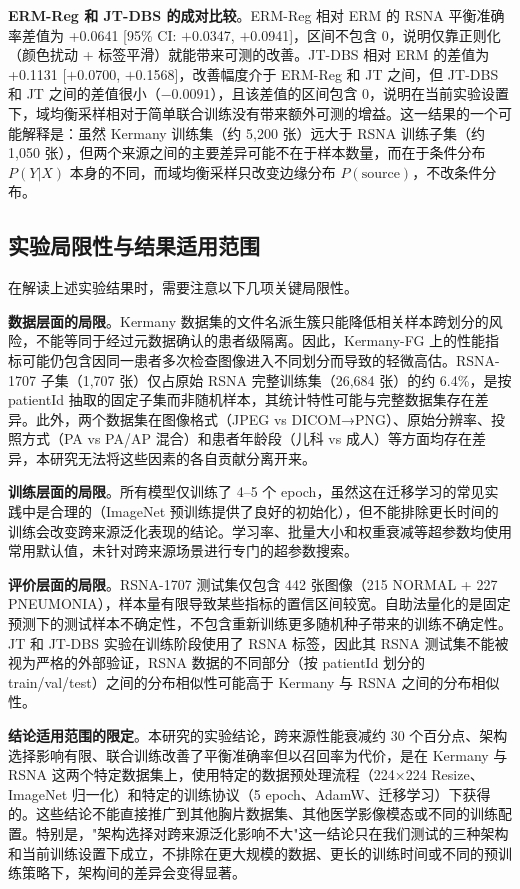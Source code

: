 \documentclass[12pt,a4paper,UTF8,openany]{ctexbook}
\begin{document}
\textbf{ERM-Reg 和 JT-DBS 的成对比较}。ERM-Reg 相对 ERM 的 RSNA 平衡准确率差值为 +0.0641 [95\% CI: $+$0.0347, $+$0.0941]，区间不包含 0，说明仅靠正则化（颜色扰动 + 标签平滑）就能带来可测的改善。JT-DBS 相对 ERM 的差值为 +0.1131 [$+$0.0700, $+$0.1568]，改善幅度介于 ERM-Reg 和 JT 之间，但 JT-DBS 和 JT 之间的差值很小（$-0.0091$），且该差值的区间包含 0，说明在当前实验设置下，域均衡采样相对于简单联合训练没有带来额外可测的增益。这一结果的一个可能解释是：虽然 Kermany 训练集（约 5,200 张）远大于 RSNA 训练子集（约 1,050 张），但两个来源之间的主要差异可能不在于样本数量，而在于条件分布 $P(Y|X)$ 本身的不同，而域均衡采样只改变边缘分布 $P(\text{source})$，不改条件分布。

\subsection{实验局限性与结果适用范围}

在解读上述实验结果时，需要注意以下几项关键局限性。

\textbf{数据层面的局限}。Kermany 数据集的文件名派生簇只能降低相关样本跨划分的风险，不能等同于经过元数据确认的患者级隔离。因此，Kermany-FG 上的性能指标可能仍包含因同一患者多次检查图像进入不同划分而导致的轻微高估。RSNA-1707 子集（1,707 张）仅占原始 RSNA 完整训练集（26,684 张）的约 6.4\%，是按 patientId 抽取的固定子集而非随机样本，其统计特性可能与完整数据集存在差异。此外，两个数据集在图像格式（JPEG vs DICOM→PNG）、原始分辨率、投照方式（PA vs PA/AP 混合）和患者年龄段（儿科 vs 成人）等方面均存在差异，本研究无法将这些因素的各自贡献分离开来。

\textbf{训练层面的局限}。所有模型仅训练了 4--5 个 epoch，虽然这在迁移学习的常见实践中是合理的（ImageNet 预训练提供了良好的初始化），但不能排除更长时间的训练会改变跨来源泛化表现的结论。学习率、批量大小和权重衰减等超参数均使用常用默认值，未针对跨来源场景进行专门的超参数搜索。

\textbf{评价层面的局限}。RSNA-1707 测试集仅包含 442 张图像（215 NORMAL + 227 PNEUMONIA），样本量有限导致某些指标的置信区间较宽。自助法量化的是固定预测下的测试样本不确定性，不包含重新训练更多随机种子带来的训练不确定性。JT 和 JT-DBS 实验在训练阶段使用了 RSNA 标签，因此其 RSNA 测试集不能被视为严格的外部验证，RSNA 数据的不同部分（按 patientId 划分的 train/val/test）之间的分布相似性可能高于 Kermany 与 RSNA 之间的分布相似性。

\textbf{结论适用范围的限定}。本研究的实验结论，跨来源性能衰减约 30 个百分点、架构选择影响有限、联合训练改善了平衡准确率但以召回率为代价，是在 Kermany 与 RSNA 这两个特定数据集上，使用特定的数据预处理流程（224×224 Resize、ImageNet 归一化）和特定的训练协议（5 epoch、AdamW、迁移学习）下获得的。这些结论不能直接推广到其他胸片数据集、其他医学影像模态或不同的训练配置。特别是，"架构选择对跨来源泛化影响不大"这一结论只在我们测试的三种架构和当前训练设置下成立，不排除在更大规模的数据、更长的训练时间或不同的预训练策略下，架构间的差异会变得显著。
\end{document}
